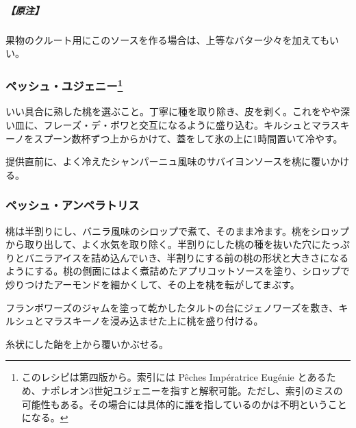 \hypertarget{ux539fux6ce8-1}{%
\subparagraph{【原注】}\label{ux539fux6ce8-1}}

果物のクルート用にこのソースを作る場合は、上等なバター少々を加えてもいい。

\hypertarget{peches-eugenie}{%
\subsubsection[ペッシュ・ユジェニー]{\texorpdfstring{ペッシュ・ユジェニー\footnote{このレシピは第四版から。索引には
  Pêches Impératrice Eugénie
  とあるため、ナポレオン3世妃ユジェニーを指すと解釈可能。ただし、索引のミスの可能性もある。その場合には具体的に誰を指しているのかは不明ということになる。}}{ペッシュ・ユジェニー}}\label{peches-eugenie}}

いい具合に熟した桃を選ぶこと。丁寧に種を取り除き、皮を剥く。これをやや深い皿に、フレーズ・デ・ボワと交互になるように盛り込む。キルシュとマラスキーノをスプーン数杯ずつ上からかけて、蓋をして氷の上に1時間置いて冷やす。

提供直前に、よく冷えたシャンパーニュ風味のサバイヨンソースを桃に覆いかける。

\hypertarget{peches-imperatrice-froides}{%
\subsubsection{ペッシュ・アンペラトリス}\label{peches-imperatrice-froides}}

桃は半割りにし、バニラ風味のシロップで煮て、そのまま冷ます。桃をシロップから取り出して、よく水気を取り除く。半割りにした桃の種を抜いた穴にたっぷりとバニラアイスを詰め込んでいき、半割りにする前の桃の形状と大きさになるようにする。桃の側面にはよく煮詰めたアプリコットソースを塗り、シロップで炒りつけたアーモンドを細かくして、その上を桃を転がしてまぶす。

フランボワーズのジャムを塗って乾かしたタルトの台にジェノワーズを敷き、キルシュとマラスキーノを浸み込ませた上に桃を盛り付ける。

糸状にした飴を上から覆いかぶせる。
